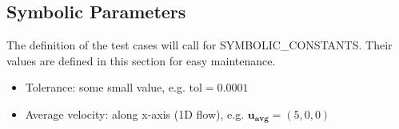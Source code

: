 \documentclass[12pt, titlepage]{article}
\begin{document}

\subsection{Symbolic Parameters} \label{secSymParams}

The definition of the test cases will call for SYMBOLIC\_CONSTANTS.
Their values are defined in this section for easy maintenance.

\begin{itemize}
  \item Tolerance: some small value, e.g. $\text{tol}=0.0001$
  \item Average velocity: along x-axis (1D flow), e.g. $\mathbf{u_{avg}}=(5,0,0)$
\end{itemize}









\end{document}
